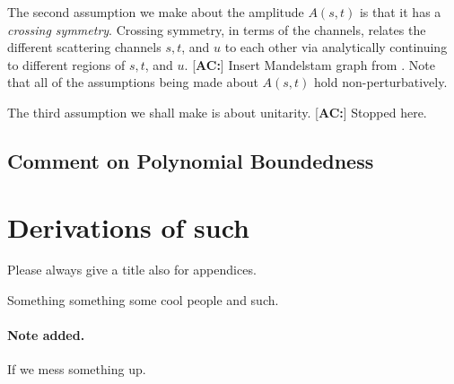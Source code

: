 \documentclass[a4paper,11pt]{article}
\newcommand{\ac}[1]{\textcolor{green3}{[\textbf{AC:}] #1}}
\begin{document}
The second assumption we make about the amplitude $A(s,t)$ is that it has a \textit{crossing symmetry}. Crossing symmetry, in terms of the channels, relates the different scattering channels $s,t$, and $u$ to each other via analytically continuing to different regions of $s,t$, and $u$. \ac{Insert Mandelstam graph from \cite{Eden:1966dnq}}. Note that all of the assumptions being made about $A(s,t)$ hold non-perturbatively. 

The third assumption we shall make is about unitarity. \ac{Stopped here.}

\subsection{Comment on Polynomial Boundedness}

\appendix
\section{Derivations of such}
Please always give a title also for appendices.





\acknowledgments

Something something some cool people and such.

\paragraph{Note added.} If we mess something up.

\end{document}
